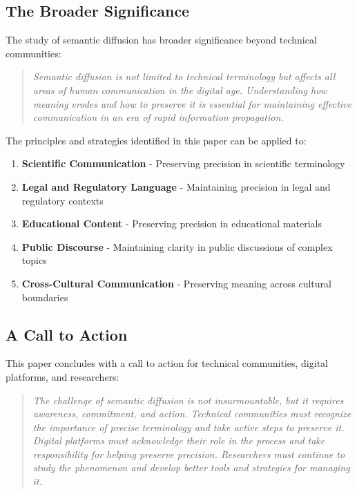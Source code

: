 \documentclass[11pt]{article}
\begin{document}
\subsection{The Broader Significance}

The study of semantic diffusion has broader significance beyond technical communities:

\begin{quote}
\emph{Semantic diffusion is not limited to technical terminology but affects all areas of human communication in the digital age. Understanding how meaning erodes and how to preserve it is essential for maintaining effective communication in an era of rapid information propagation.}
\end{quote}

The principles and strategies identified in this paper can be applied to:

\begin{enumerate}
\item \textbf{Scientific Communication} - Preserving precision in scientific terminology
\item \textbf{Legal and Regulatory Language} - Maintaining precision in legal and regulatory contexts
\item \textbf{Educational Content} - Preserving precision in educational materials
\item \textbf{Public Discourse} - Maintaining clarity in public discussions of complex topics
\item \textbf{Cross-Cultural Communication} - Preserving meaning across cultural boundaries
\end{enumerate}

\subsection{A Call to Action}

This paper concludes with a call to action for technical communities, digital platforms, and researchers:

\begin{quote}
\emph{The challenge of semantic diffusion is not insurmountable, but it requires awareness, commitment, and action. Technical communities must recognize the importance of precise terminology and take active steps to preserve it. Digital platforms must acknowledge their role in the process and take responsibility for helping preserve precision. Researchers must continue to study the phenomenon and develop better tools and strategies for managing it.}
\end{quote}
\end{document}
